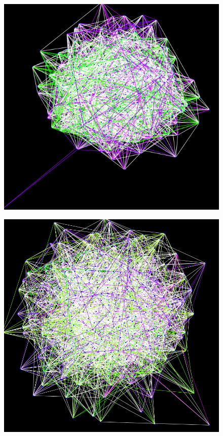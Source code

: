 \begin{figure}
\centering \includegraphics[scale=0.3]{uuf250-090.png}
\caption{}\label{}
\end{figure}
\begin{figure}
\centering \includegraphics[scale=0.3]{uuf070.png}
\caption{}\label{}
\end{figure}
